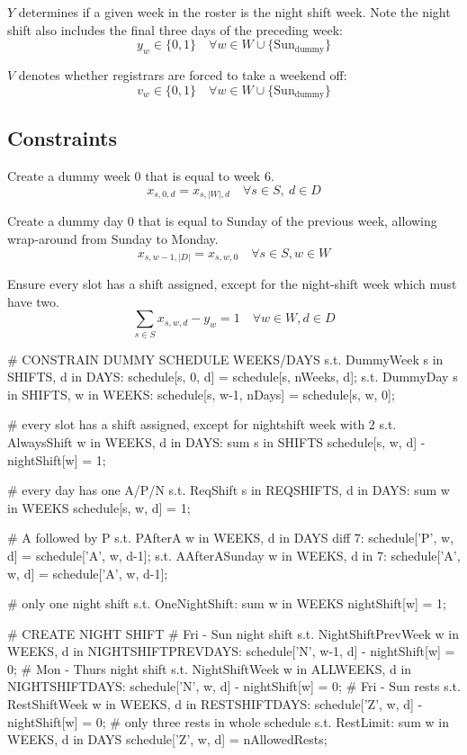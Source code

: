 \documentclass[a4paper]{article}
\begin{document}
$Y$ determines if a given week in the roster is the night shift week. Note the night shift also includes the final three days of the preceding week:
$$y_w \in \{0, 1\} \quad\forall w\in W \cup \{\text{Sun}_\text{dummy}\}$$

$V$ denotes whether registrars are forced to take a weekend off:
$$v_w \in \{0, 1\} \quad\forall w\in W \cup \{\text{Sun}_\text{dummy}\}$$

\subsection{Constraints}

Create a dummy week 0 that is equal to week 6.
\begin{equation}
  x_{s, 0, d} = x_{s, |W|, d} \quad\forall s\in S,\ d\in D
\end{equation}

Create a dummy day 0 that is equal to Sunday of the previous week, allowing wrap-around from Sunday to Monday.
\begin{equation}
  x_{s, w-1, |D|} = x_{s, w, 0} \quad\forall s\in S, w\in W
\end{equation}

Ensure every slot has a shift assigned, except for the night-shift week which must have two.
\begin{equation}
  \sum_{s\in S} x_{s, w, d} - y_w = 1 \quad\forall w\in W, d\in D
\end{equation}

\iffalse
# CONSTRAIN DUMMY SCHEDULE WEEKS/DAYS
s.t. DummyWeek {s in SHIFTS, d in DAYS}:
	schedule[s, 0, d] = schedule[s, nWeeks, d];
s.t. DummyDay {s in SHIFTS, w in WEEKS}:
	schedule[s, w-1, nDays] = schedule[s, w, 0];

# every slot has a shift assigned, except for nightshift week with 2
s.t. AlwaysShift {w in WEEKS, d in DAYS}:
	sum {s in SHIFTS} schedule[s, w, d] - nightShift[w] = 1;

# every day has one A/P/N
s.t. ReqShift {s in REQSHIFTS, d in DAYS}:
	sum {w in WEEKS} schedule[s, w, d] = 1;

# A followed by P
s.t. PAfterA {w in WEEKS, d in DAYS diff {7}}:
	schedule['P', w, d] = schedule['A', w, d-1];
s.t. AAfterASunday {w in WEEKS, d in {7}}:
	schedule['A', w, d] = schedule['A', w, d-1];

# only one night shift
s.t. OneNightShift:
	sum {w in WEEKS} nightShift[w] = 1;

# CREATE NIGHT SHIFT
# Fri - Sun night shift
s.t. NightShiftPrevWeek {w in WEEKS, d in NIGHTSHIFTPREVDAYS}:
	schedule['N', w-1, d] - nightShift[w] = 0;
# Mon - Thurs night shift
s.t. NightShiftWeek {w in ALLWEEKS, d in NIGHTSHIFTDAYS}:
	schedule['N', w, d] - nightShift[w] = 0;
# Fri - Sun rests
s.t. RestShiftWeek {w in WEEKS, d in RESTSHIFTDAYS}:
	schedule['Z', w, d] - nightShift[w] = 0;
# only three rests in whole schedule
s.t. RestLimit:
	sum {w in WEEKS, d in DAYS} schedule['Z', w, d] = nAllowedRests;
\end{document}
